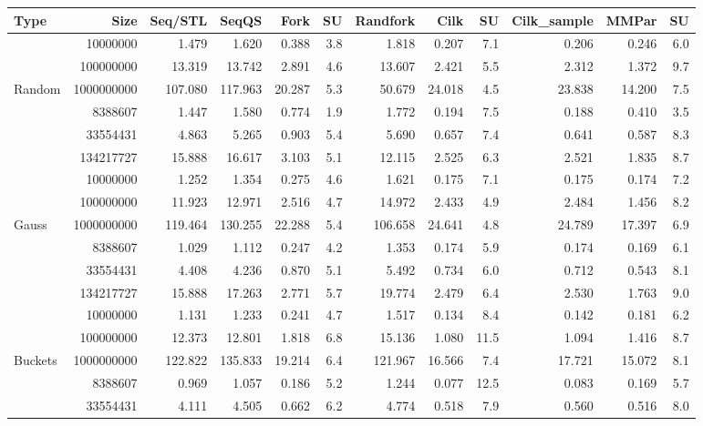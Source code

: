 \documentclass[preprint]{sigplanconf}
\begin{document}
\begin{table*}[t!]
\begin{center}
\begin{tabular}{|lr|rr|rrr|rrr||rr|}
\hline
Type & Size & Seq/STL & SeqQS & Fork & SU & Randfork & Cilk & SU & Cilk\_sample & MMPar & SU \\
\hline
 & 10000000 & 1.479 & 1.620 & 0.388 & 3.8 & 1.818 & 0.207 & 7.1 & 0.206 & 0.246 & 6.0 \\
 & 100000000 & 13.319 & 13.742 & 2.891 & 4.6 & 13.607 & 2.421 & 5.5 & 2.312 & 1.372 & 9.7 \\
Random & 1000000000 & 107.080 & 117.963 & 20.287 & 5.3 & 50.679 & 24.018 & 4.5 & 23.838 & 14.200 & 7.5 \\
 & 8388607 & 1.447 & 1.580 & 0.774 & 1.9 & 1.772 & 0.194 & 7.5 & 0.188 & 0.410 & 3.5 \\
 & 33554431 & 4.863 & 5.265 & 0.903 & 5.4 & 5.690 & 0.657 & 7.4 & 0.641 & 0.587 & 8.3 \\
 & 134217727 & 15.888 & 16.617 & 3.103 & 5.1 & 12.115 & 2.525 & 6.3 & 2.521 & 1.835 & 8.7 \\
\hline
 & 10000000 & 1.252 & 1.354 & 0.275 & 4.6 & 1.621 & 0.175 & 7.1 & 0.175 & 0.174 & 7.2 \\
 & 100000000 & 11.923 & 12.971 & 2.516 & 4.7 & 14.972 & 2.433 & 4.9 & 2.484 & 1.456 & 8.2 \\
Gauss & 1000000000 & 119.464 & 130.255 & 22.288 & 5.4 & 106.658 & 24.641 & 4.8 & 24.789 & 17.397 & 6.9 \\
 & 8388607 & 1.029 & 1.112 & 0.247 & 4.2 & 1.353 & 0.174 & 5.9 & 0.174 & 0.169 & 6.1 \\
 & 33554431 & 4.408 & 4.236 & 0.870 & 5.1 & 5.492 & 0.734 & 6.0 & 0.712 & 0.543 & 8.1 \\
 & 134217727 & 15.888 & 17.263 & 2.771 & 5.7 & 19.774 & 2.479 & 6.4 & 2.530 & 1.763 & 9.0 \\
\hline
 & 10000000 & 1.131 & 1.233 & 0.241 & 4.7 & 1.517 & 0.134 & 8.4 & 0.142 & 0.181 & 6.2 \\
 & 100000000 & 12.373 & 12.801 & 1.818 & 6.8 & 15.136 & 1.080 & 11.5 & 1.094 & 1.416 & 8.7 \\
Buckets & 1000000000 & 122.822 & 135.833 & 19.214 & 6.4 & 121.967 & 16.566 & 7.4 & 17.721 & 15.072 & 8.1 \\
 & 8388607 & 0.969 & 1.057 & 0.186 & 5.2 & 1.244 & 0.077 & 12.5 & 0.083 & 0.169 & 5.7 \\
 & 33554431 & 4.111 & 4.505 & 0.662 & 6.2 & 4.774 & 0.518 & 7.9 & 0.560 & 0.516 & 8.0 \\

\end{tabular}
\end{center}
\end{table*}
\end{document}
